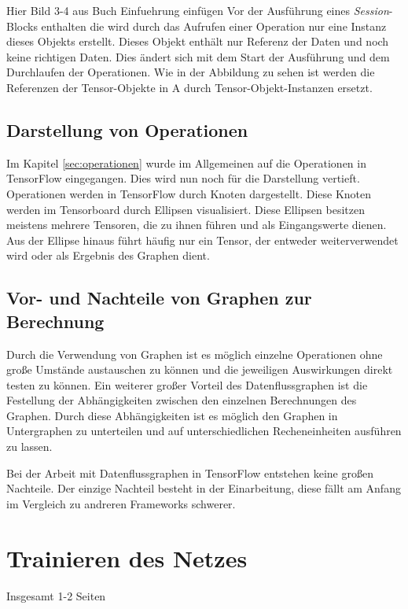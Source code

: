 Hier Bild 3-4 aus Buch Einfuehrung einfügen
Vor der Ausführung eines \textit{Session}-Blocks enthalten die wird durch das Aufrufen einer Operation nur eine Instanz dieses Objekts erstellt. Dieses Objekt enthält nur Referenz der Daten und noch keine richtigen Daten. Dies ändert sich mit dem Start der Ausführung und dem Durchlaufen der Operationen. Wie in der Abbildung zu sehen ist werden die Referenzen der Tensor-Objekte in A durch Tensor-Objekt-Instanzen ersetzt.

\subsection{Darstellung von Operationen}
\label{sec:darstellungOperationen}
Im Kapitel \ref{sec:operationen} wurde im Allgemeinen auf die Operationen in TensorFlow eingegangen. Dies wird nun noch für die Darstellung vertieft. Operationen werden in TensorFlow durch Knoten dargestellt. Diese Knoten werden im Tensorboard durch Ellipsen visualisiert. Diese Ellipsen besitzen meistens mehrere Tensoren, die zu ihnen führen und als Eingangswerte dienen. Aus der Ellipse hinaus führt häufig nur ein Tensor, der entweder weiterverwendet wird oder als Ergebnis des Graphen dient. 


\subsection{Vor- und Nachteile von Graphen zur Berechnung}
\label{sec:vorUndNachteile}
Durch die Verwendung von Graphen ist es möglich einzelne Operationen ohne große Umstände austauschen zu können und die jeweiligen Auswirkungen direkt testen zu können. Ein weiterer großer Vorteil des Datenflussgraphen ist die Festellung der Abhängigkeiten zwischen den einzelnen Berechnungen des Graphen. Durch diese Abhängigkeiten ist es möglich den Graphen in Untergraphen zu unterteilen und auf unterschiedlichen Recheneinheiten ausführen zu lassen. 

Bei der Arbeit mit Datenflussgraphen in TensorFlow entstehen keine großen Nachteile. Der einzige Nachteil besteht in der Einarbeitung, diese fällt am Anfang im Vergleich zu andreren Frameworks schwerer.

\section{Trainieren des Netzes}
\label{sec:trainierenDesNetzes}
\printsubchapterauthor{\authorNiklas}
Insgesamt 1-2 Seiten
